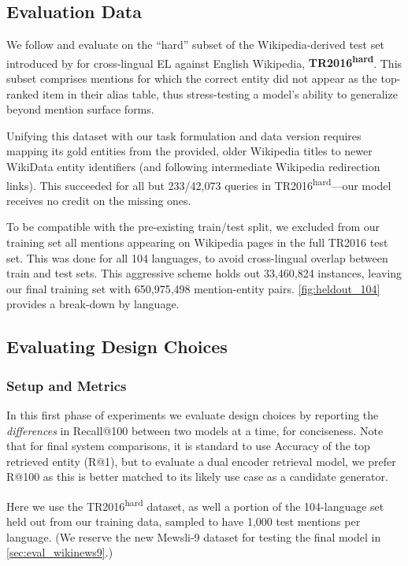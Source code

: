 \documentclass[11pt,a4paper]{article}
\newcommand*{\TR}{TR2016\textsuperscript{hard}}
\begin{document}
\subsection{Evaluation Data}
We follow  and evaluate on the ``hard'' subset of the Wikipedia-derived test set introduced by
 for cross-lingual EL against English Wikipedia, \textbf{\TR}.
This subset comprises mentions for which the correct entity did not appear as the top-ranked item in their alias table, thus stress-testing a model's ability to generalize beyond mention surface forms. 

Unifying this dataset with our task formulation and data version requires mapping its gold entities from the provided, older Wikipedia titles to newer WikiData entity identifiers (and following intermediate Wikipedia redirection links).
This succeeded for all but 233/42,073 queries in \TR{}---our model receives no credit on the missing ones.

To be compatible with the pre-existing train/test split, we excluded from our training set all mentions appearing on Wikipedia pages in the full TR2016 test set.
This was done for all 104 languages, to avoid cross-lingual overlap between train and test sets.
This aggressive scheme holds out 33,460,824 instances, leaving our final training set with 650,975,498 mention-entity pairs. \autoref{fig:heldout_104} provides a break-down by language.

\subsection{Evaluating Design Choices}\label{sec:eval_design_choices}

\subsubsection{Setup and Metrics}
In this first phase of experiments we evaluate design choices by reporting the \emph{differences} in Recall@100 between two models at a time, for conciseness.
Note that for final system comparisons, it is standard to use Accuracy of the top retrieved entity (R@1), but to evaluate a dual encoder retrieval model, we prefer R@100 as this is better matched to its likely use case as a candidate generator.

Here we use the \TR{} dataset, as well a portion of the 104-language set held out from our training data, sampled to have 1,000 test mentions per language.
(We reserve the new \mbox{Mewsli-9} dataset for testing the final model in \autoref{sec:eval_wikinews9}.)
\end{document}
